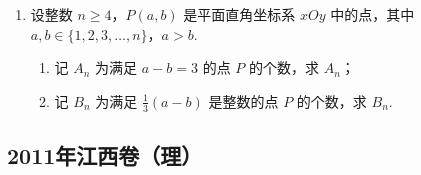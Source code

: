 \begin{description}
\begin{enumerate}[leftmargin=5pt]
        \item 设整数 \(n\geqslant 4\)，\(P(a,b)\) 是平面直角坐标系 \(xOy\) 中的点，其中 \(a,b\in\{1,2,3,\dots,n\}\)，\(a>b\).
\begin{enumerate}
\item 记 \(A_{n}\) 为满足 \(a-b=3\) 的点 \(P\) 的个数，求 \(A_{n}\)；
\item 记 \(B_{n}\) 为满足 \(\frac{1}{3}(a-b)\) 是整数的点 \(P\) 的个数，求 \(B_{n}\).
\end{enumerate}

    \end{enumerate}

\end{description}


\subsection{2011年江西卷（理）}\label{gk:2011年江西卷（理）}

